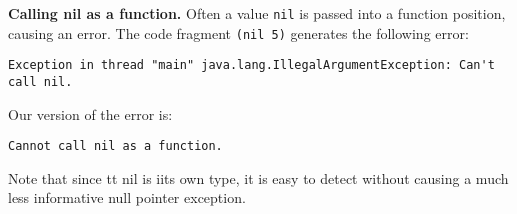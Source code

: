 \documentclass[submission,copyright,creativecommons]{eptcs}
\newcommand{\allcomments}[1]{{#1}}
\newcommand{\emcomment}[1]{{\bf \textcolor{ForestGreen}{\allcomments{{#1}}}}}
\newcommand{\hfcomment}[1]{\textcolor{Teal}{\allcomments{Henry: {#1}}}}
\begin{document}
{\bf Calling nil as a function.} Often a value {\tt nil} is passed into a function position, causing an error. 
The code fragment {\tt (nil 5)} generates the following error: 
\begin{verbatim}
Exception in thread "main" java.lang.IllegalArgumentException: Can't call nil. 
\end{verbatim}
Our version of the error is:
\begin{verbatim}
Cannot call nil as a function.
\end{verbatim}
Note that since {tt nil} is iits own type, it is easy to detect without causing a much less informative null pointer exception. 

%
%
% 
%
% 
\end{document}
